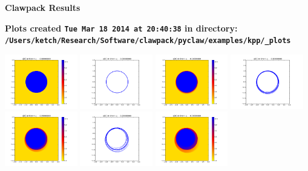 \documentclass[11pt]{article}
\begin{document}
        \begin{center}{\Large\bf Clawpack Results}\vskip 5pt
        
        \bf Plots created {\tt Tue Mar 18 2014 at 20:40:38} in directory: \vskip 5pt
        \verb+/Users/ketch/Research/Software/clawpack/pyclaw/examples/kpp/_plots+
        \end{center}
        \vskip 5pt
        \includegraphics[width=0.2375\textwidth]{frame0000fig0.png}
\includegraphics[width=0.2375\textwidth]{frame0000fig1.png}
\includegraphics[width=0.2375\textwidth]{frame0001fig0.png}
\includegraphics[width=0.2375\textwidth]{frame0001fig1.png}
\vskip 10pt 
\includegraphics[width=0.2375\textwidth]{frame0002fig0.png}
\includegraphics[width=0.2375\textwidth]{frame0002fig1.png}
\includegraphics[width=0.2375\textwidth]{frame0003fig0.png}
\end{document}
